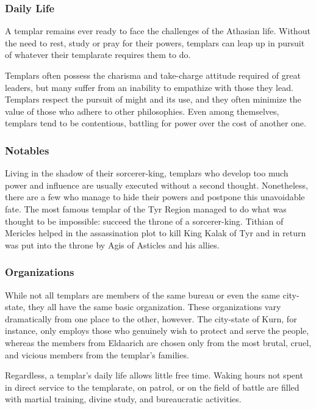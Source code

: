 \subsubsection{Daily Life}
A templar remains ever ready to face the challenges of the Athasian life. Without the need to rest, study or pray for their powers, templars can leap up in pursuit of whatever their templarate requires them to do.

Templars often possess the charisma and take-charge attitude required of great leaders, but many suffer from an inability to empathize with those they lead. Templars respect the pursuit of might and its use, and they often minimize the value of those who adhere to other philosophies. Even among themselves, templars tend to be contentious, battling for power over the cost of another one.

\subsubsection{Notables}
Living in the shadow of their sorcerer-king, templars who develop too much power and influence are usually executed without a second thought. Nonetheless, there are a few who manage to hide their powers and postpone this unavoidable fate. The most famous templar of the Tyr Region managed to do what was thought to be impossible: succeed the throne of a sorcerer-king. Tithian of Mericles helped in the assassination plot to kill King Kalak of Tyr and in return was put into the throne by Agis of Asticles and his allies.

\subsubsection{Organizations}
While not all templars are members of the same bureau or even the same city-state, they all have the same basic organization. These organizations vary dramatically from one place to the other, however. The city-state of Kurn, for instance, only employs those who genuinely wish to protect and serve the people, whereas the members from Eldaarich are chosen only from the most brutal, cruel, and vicious members from the templar's families.

Regardless, a templar's daily life allows little free time. Waking hours not spent in direct service to the templarate, on patrol, or on the field of battle are filled with martial training, divine study, and bureaucratic
activities.

